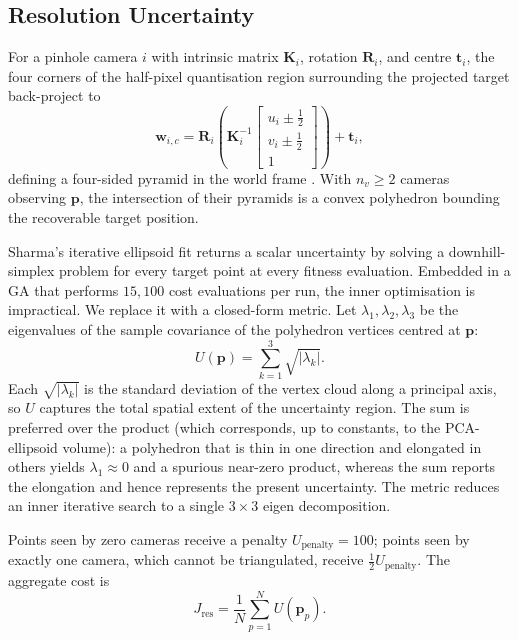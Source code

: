 \documentclass[conference]{IEEEtran}
\begin{document}
\subsection{Resolution Uncertainty} \label{RU}
For a pinhole camera $i$ with intrinsic matrix $\mathbf{K}_i$, rotation $\mathbf{R}_i$, and centre $\mathbf{t}_i$, the four corners of the half-pixel quantisation region surrounding the projected target back-project to
\begin{equation}
\label{eq:backproject}
\mathbf{w}_{i,c} = \mathbf{R}_i\!\left(\mathbf{K}_i^{-1}\!\begin{bmatrix} u_i \pm \tfrac{1}{2} \\ v_i \pm \tfrac{1}{2} \\ 1 \end{bmatrix}\right) + \mathbf{t}_i,
\end{equation}
defining a four-sided pyramid in the world frame \cite{sharma_analysis_1998}. With $n_v \geq 2$ cameras observing $\mathbf{p}$, the intersection of their pyramids is a convex polyhedron bounding the recoverable target position.

Sharma's iterative ellipsoid fit returns a scalar uncertainty by solving a downhill-simplex problem for every target point at every fitness evaluation. Embedded in a GA that performs $15{,}100$ cost evaluations per run, the inner optimisation is impractical. We replace it with a closed-form metric. Let $\lambda_1, \lambda_2, \lambda_3$ be the eigenvalues of the sample covariance of the polyhedron vertices centred at $\mathbf{p}$:
\begin{equation}
\label{eq:uncertainty-metric}
U(\mathbf{p}) = \sum_{k=1}^{3} \sqrt{|\lambda_k|}.
\end{equation}
Each $\sqrt{|\lambda_k|}$ is the standard deviation of the vertex cloud along a principal axis, so $U$ captures the total spatial extent of the uncertainty region. The sum is preferred over the product (which corresponds, up to constants, to the \gls{PCA}-ellipsoid volume): a polyhedron that is thin in one direction and elongated in others yields $\lambda_1\!\approx\!0$ and a spurious near-zero product, whereas the sum reports the elongation and hence represents the present uncertainty. The metric reduces an inner iterative search to a single $3\!\times\!3$ eigen decomposition.

Points seen by zero cameras receive a penalty $U_\text{penalty} = 100$; points seen by exactly one camera, which cannot be triangulated, receive $\tfrac{1}{2}U_\text{penalty}$. The aggregate cost is
\begin{equation}
\label{eq:res-cost}
J_\text{res} = \frac{1}{N}\sum_{p=1}^{N} U(\mathbf{p}_p).
\end{equation}
\end{document}
